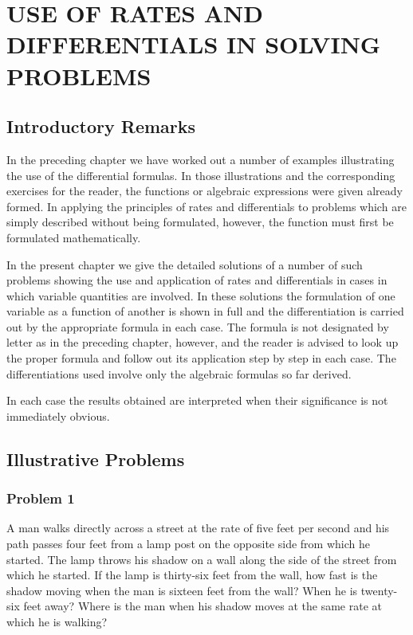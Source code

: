 \chapter{USE OF RATES AND DIFFERENTIALS IN SOLVING PROBLEMS}

\section{Introductory Remarks}
In the preceding chapter we have worked out a number of examples illustrating the use of the differential formulas. In those illustrations and the corresponding exercises for the reader, the functions or algebraic expressions were given already formed. In applying the principles of rates and differentials to problems which are simply described without being formulated, however, the function must first be formulated mathematically.

In the present chapter we give the detailed solutions of a number of such problems showing the use and application of rates and differentials in cases in which variable quantities are involved. In these solutions the formulation of one variable as a function of another is shown in full and the differentiation is carried out by the appropriate formula in each case. The formula is not designated by letter as in the preceding chapter, however, and the reader is advised to look up the proper formula and follow out its application step by step in each case. The differentiations used involve only the algebraic formulas so far derived.

In each case the results obtained are interpreted when their significance is not immediately obvious.

\section{Illustrative Problems}
\subsection*{Problem 1}
A man walks directly across a street at the rate of five feet per second and his path passes four feet from a lamp post on the opposite side from which he started. The lamp throws his shadow on a wall along the side of the street from which he started. If the lamp is thirty-six feet from the wall, how fast is the shadow moving when the man is sixteen feet from the wall? When he is twenty-six feet away? Where is the man when his shadow moves at the same rate at which he is walking?


